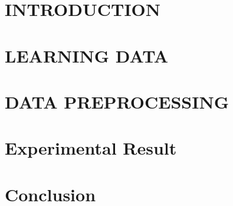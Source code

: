 \documentclass{scrartcl}
\begin{document}
    \newpage



    \doublespacing
    \tableofcontents
    \singlespacing

    \newpage

    \doublespacing


    \section{INTRODUCTION}\label{sec:introduction}
    


    \section{LEARNING DATA}\label{sec:learning-data}
    


    \section{DATA PREPROCESSING}\label{sec:data-preprocessing}
    


    \section{Experimental Result}\label{sec:experimental-result}
    


    \section{Conclusion}\label{sec:conclusion}
    
\end{document}
